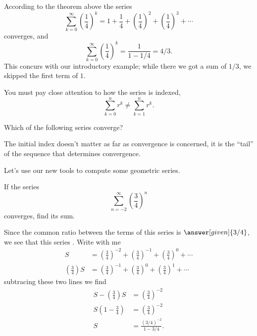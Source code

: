 \documentclass{ximera}
\begin{document}
According to the theorem above the series
\[
\sum_{k=0}^\infty \left(\frac{1}{4}\right)^k = 1 + \frac{1}{4} + \left(\frac{1}{4}\right)^2 + \left(\frac{1}{4}\right)^3 + \cdots
\]
converges, and
\[
\sum_{k=0}^\infty  \left(\frac{1}{4}\right)^k = \frac{1}{1-1/4} = 4/3.
\]
This concurs with our introductory example; while there we got a sum
of $1/3$, we skipped the first term of $1$.

\begin{warning}
  You must pay close attention to how the series is indexed,
  \[
  \sum_{k=0}^n r^k \ne \sum_{k=1}^n r^k.
  \]
\end{warning}


\begin{question}
  Which of the following series converge?
  \begin{selectAll}
  \end{selectAll}
  \begin{hint}
    The initial index doesn't matter as far as convergence is
    concerned, it is the ``tail'' of the sequence that determines
    convergence.
  \end{hint}
\end{question}

Let's use our new tools to compute some geometric series.

\begin{example}
If the series 
\[
\sum_{n=-2}^\infty \left(\frac{3}{4}\right)^n
\]
converges, find its sum.
\begin{explanation}
Since the common ratio between the terms of this series is
$\answer[given]{3/4}$, we see that this series
. Write with me
\begin{align*}
  S &= \left(\frac{3}{4}\right)^{-2} + \left(\frac{3}{4}\right)^{-1} + \left(\frac{3}{4}\right)^{0} + \cdots\\
  \left(\frac{3}{4}\right) S &= \left(\frac{3}{4}\right)^{-1} + \left(\frac{3}{4}\right)^{0} + \left(\frac{3}{4}\right)^{1} + \cdots
\end{align*}
subtracing these two lines we find
\begin{align*}
  S -  \left(\frac{3}{4}\right) S  &= \left(\frac{3}{4}\right)^{-2}\\
  S\left(1-\frac{3}{4}\right) &= \left(\frac{3}{4}\right)^{-2}\\
  S &= \frac{(3/4)^{-2}}{1-3/4}.
\end{align*}
\end{explanation}
\end{example}
\end{document}
